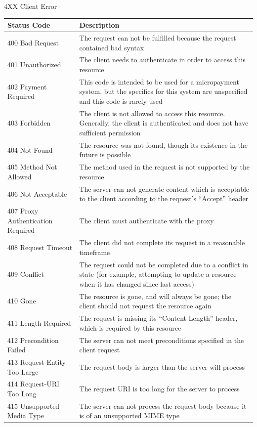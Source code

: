 \documentclass[final,table]{beamer}
\begin{document}
\begin{frame}{}
\begin{block}{\huge 4XX Client Error}
      \begin{tabular}{p{} p{}}
        Status Code & Description \\ \hline
        400 Bad Request & The request can not be fulfilled because the request contained bad syntax \\
        401 Unauthorized & The client needs to authenticate in order to access this resource \\
        402 Payment Required & This code is intended to be used for a micropayment system, but the specifics for this system are unspecified and this code is rarely used \\
        403 Forbidden & The client is not allowed to access this resource. Generally, the client is authenticated and does not have sufficient permission \\
        404 Not Found & The resource was not found, though its existence in the future is possible \\
        405 Method Not Allowed & The method used in the request is not supported by the resource \\
        406 Not Acceptable & The server can not generate content which is acceptable to the client according to the request's ``Accept'' header \\
        407 Proxy Authentication Required & The client must authenticate with the proxy \\
        408 Request Timeout & The client did not complete its request in a reasonable timeframe \\
        409 Conflict & The request could not be completed due to a conflict in state (for example, attempting to update a resource when it has changed since last access) \\
        410 Gone & The resource is gone, and will always be gone; the client should not request the resource again \\
        411 Length Required & The request is missing its ``Content-Length'' header, which is required by this resource \\
        412 Precondition Failed & The server can not meet preconditions specified in the client request \\
        413 Request Entity Too Large & The request body is larger than the server will process \\
        414 Request-URI Too Long & The request URI is too long for the server to process \\
        415 Unsupported Media Type & The server can not process the request body because it is of an unsupported MIME type \\

\end{tabular}
\end{block}
\end{frame}
\end{document}
